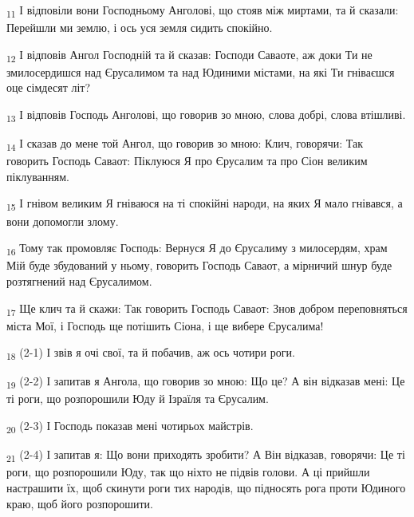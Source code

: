 \begin{tcolorbox}
\textsubscript{11} І відповіли вони Господньому Анголові, що стояв між миртами, та й сказали: Перейшли ми землю, і ось уся земля сидить спокійно.
\end{tcolorbox}
\begin{tcolorbox}
\textsubscript{12} І відповів Ангол Господній та й сказав: Господи Саваоте, аж доки Ти не змилосердишся над Єрусалимом та над Юдиними містами, на які Ти гніваєшся оце сімдесят літ?
\end{tcolorbox}
\begin{tcolorbox}
\textsubscript{13} І відповів Господь Анголові, що говорив зо мною, слова добрі, слова втішливі.
\end{tcolorbox}
\begin{tcolorbox}
\textsubscript{14} І сказав до мене той Ангол, що говорив зо мною: Клич, говорячи: Так говорить Господь Саваот: Піклуюся Я про Єрусалим та про Сіон великим піклуванням.
\end{tcolorbox}
\begin{tcolorbox}
\textsubscript{15} І гнівом великим Я гніваюся на ті спокійні народи, на яких Я мало гнівався, а вони допомогли злому.
\end{tcolorbox}
\begin{tcolorbox}
\textsubscript{16} Тому так промовляє Господь: Вернуся Я до Єрусалиму з милосердям, храм Мій буде збудований у ньому, говорить Господь Саваот, а мірничий шнур буде розтягнений над Єрусалимом.
\end{tcolorbox}
\begin{tcolorbox}
\textsubscript{17} Ще клич та й скажи: Так говорить Господь Саваот: Знов добром переповняться міста Мої, і Господь ще потішить Сіона, і ще вибере Єрусалима!
\end{tcolorbox}
\begin{tcolorbox}
\textsubscript{18} (2-1) І звів я очі свої, та й побачив, аж ось чотири роги.
\end{tcolorbox}
\begin{tcolorbox}
\textsubscript{19} (2-2) І запитав я Ангола, що говорив зо мною: Що це? А він відказав мені: Це ті роги, що розпорошили Юду й Ізраїля та Єрусалим.
\end{tcolorbox}
\begin{tcolorbox}
\textsubscript{20} (2-3) І Господь показав мені чотирьох майстрів.
\end{tcolorbox}
\begin{tcolorbox}
\textsubscript{21} (2-4) І запитав я: Що вони приходять зробити? А Він відказав, говорячи: Це ті роги, що розпорошили Юду, так що ніхто не підвів голови. А ці прийшли настрашити їх, щоб скинути роги тих народів, що підносять рога проти Юдиного краю, щоб його розпорошити.
\end{tcolorbox}
